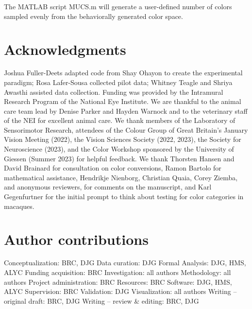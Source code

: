 \documentclass[9pt,biorxiv,lineno,onehalfspacing]{lapreprint}
\begin{document}
\begin{refsection}
The MATLAB script MUCS.m will generate a user-defined number of colors sampled evenly from the behaviorally generated color space.


\printbibliography[title=Methods References]
\end{refsection}

\section{Acknowledgments}

Joshua Fuller-Deets adapted code from Shay Ohayon to create the experimental paradigm; Rosa Lafer-Sousa collected pilot data; Whitney Teagle and Shriya Awasthi assisted data collection. 
Funding was provided by the Intramural Research Program of the National Eye Institute. 
We are thankful to the animal care team lead by Denise Parker and Hayden Warnock and to the veterinary staff of the NEI for excellent animal care. 
We thank members of the Laboratory of Sensorimotor Research, attendees of the Colour Group of Great Britain’s January Vision Meeting (2022), the Vision Sciences Society (2022, 2023), the Society for Neuroscience (2023), and the Color Workshop sponsored by the University of Giessen (Summer 2023) for helpful feedback. 
We thank Thorsten Hansen and David Brainard for consultation on color conversions, Ramon Bartolo for mathematical assistance, Hendrikje Nienborg, Christian Quaia, Corey Ziemba, and anonymous reviewers, for comments on the manuscript, and Karl Gegenfurtner for the initial prompt to think about testing for color categories in macaques.

\section{Author contributions}


Conceptualization: BRC, DJG\newline
Data curation: DJG\newline
Formal Analysis: DJG, HMS, ALYC\newline
Funding acquisition: BRC\newline
Investigation: all authors\newline
Methodology: all authors\newline
Project administration: BRC\newline
Resources: BRC\newline
Software: DJG, HMS, ALYC\newline
Supervision: BRC\newline
Validation: DJG\newline
Visualization: all authors\newline
Writing – original draft: BRC, DJG\newline
Writing – review \& editing: BRC, DJG\newline
\end{document}
